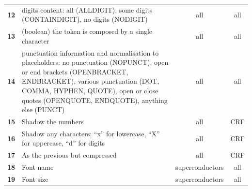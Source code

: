 \begin{table}
\begin{tabular}{l m{30em} c c}
        \textbf{12}   & digits content: all (ALLDIGIT), some digits (CONTAINDIGIT), no digits (NODIGIT)                                                                                                                                                                          & all             & all                   \\
        \textbf{13}   & (boolean) the token is composed by a single character                                                                                                                                                                                                    & all             & all                   \\
        \textbf{14}   & punctuation information and normalisation to placeholders: no punctuation (NOPUNCT), open or end brackets (OPENBRACKET, ENDBRACKET), various punctuation (DOT, COMMA, HYPHEN, QUOTE), open or close quotes (OPENQUOTE, ENDQUOTE), anything else (PUNCT) & all             & all                   \\
        \textbf{15}   & Shadow the numbers                                                                                                                                                                                                                                       & all             & CRF                   \\
        \textbf{16}   & Shadow any characters: ``x'' for lowercase, ``X'' for uppercase, ``d'' for digits                                                                                                                                                                        & all             & CRF                   \\
        \textbf{17}   & As the previous but compressed                                                                                                                                                                                                                           & all             & CRF                   \\
        \textbf{18}   & Font name                                                                                                                                                                                                                                                & superconductors & all                   \\
        \textbf{19}   & Font size                                                                                                                                                                                                                                                & superconductors & all                   \\

\end{tabular}
\end{table}

